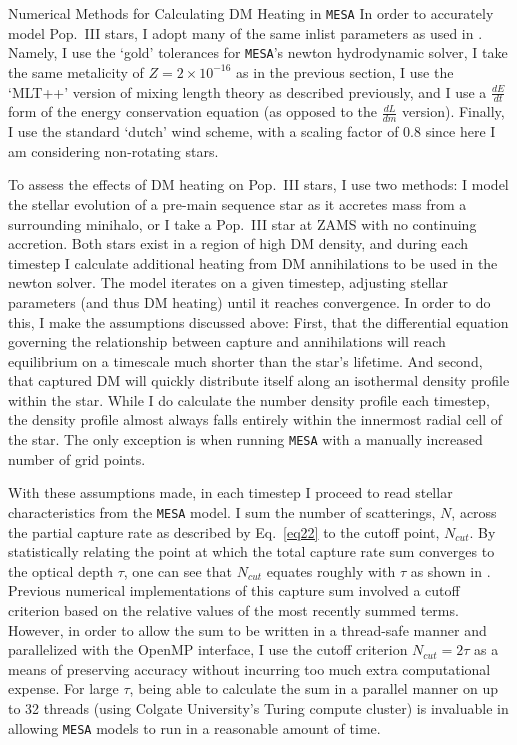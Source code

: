 \documentclass[a4paper,11pt]{article}
\begin{document}
\begin{section}{Numerical Methods for Calculating DM Heating in \texttt{MESA}}
    In order to accurately model Pop.~III stars, I adopt many of the same inlist parameters as used in \cite{Windhorst:2019}.
    Namely, I use the `gold' tolerances for \texttt{MESA}'s newton hydrodynamic solver, I take the same metalicity of $Z = 2 \times 10^{-16}$ as in the previous section, I use the `MLT++' version of mixing length theory as described previously, and I use a $\frac{dE}{dt}$ form of the energy conservation equation (as opposed to the $\frac{dL}{dm}$ version).
    Finally, I use the standard `dutch' wind scheme, with a scaling factor of 0.8 since here I am considering non-rotating stars.

    To assess the effects of DM heating on Pop.~III stars, I use two methods: I model the stellar evolution of a pre-main sequence star as it accretes mass from a surrounding minihalo, or I take a Pop.~III star at ZAMS with no continuing accretion.
    Both stars exist in a region of high DM density, and during each timestep I calculate additional heating from DM annihilations to be used in the newton solver.
    The model iterates on a given timestep, adjusting stellar parameters (and thus DM heating) until it reaches convergence.
    In order to do this, I make the assumptions discussed above: First, that the differential equation governing the relationship between capture and annihilations will reach equilibrium on a timescale much shorter than the star's lifetime.
    And second, that captured DM will quickly distribute itself along an isothermal density profile within the star.
    While I do calculate the number density profile each timestep, the density profile almost always falls entirely within the innermost radial cell of the star.
    The only exception is when running \texttt{MESA} with a manually increased number of grid points.

    With these assumptions made, in each timestep I proceed to read stellar characteristics from the \texttt{MESA} model. I sum the number of scatterings, $N$, across the partial capture rate as described by Eq.~\ref{eq22} to the cutoff point, $N_{cut}$.
    By statistically relating the point at which the total capture rate sum converges to the optical depth $\tau$, one can see that $N_{cut}$ equates roughly with $\tau$ as shown in \cite{Ilie:2019}.
    Previous numerical implementations of this capture sum involved a cutoff criterion based on the relative values of the most recently summed terms.
    However, in order to allow the sum to be written in a thread-safe manner and parallelized with the OpenMP interface, I use the cutoff criterion $N_{cut} = 2\tau$ as a means of preserving accuracy without incurring too much extra computational expense.
    For large $\tau$, being able to calculate the sum in a parallel manner on up to 32 threads (using Colgate University's Turing compute cluster) is invaluable in allowing \texttt{MESA} models to run in a reasonable amount of time.


\end{section}
\end{document}
